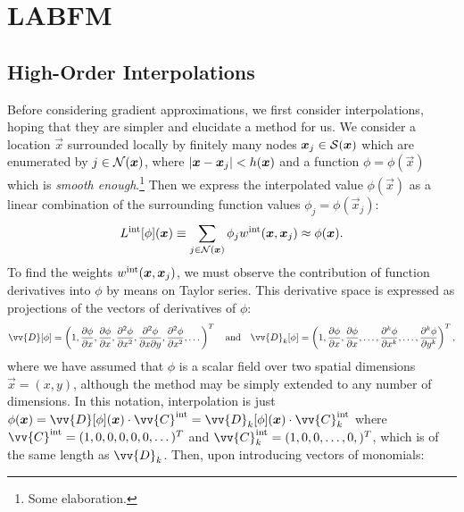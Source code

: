 

\section{LABFM}

\cite{king2024MeshFreeFrameworkHighOrder, king2020HighOrderDifference, king2024MeshfreeFrameworkHighorder, king2022HighorderSimulationsIsothermal, king2024SunsetFlamesDNSCode}


\subsection{High-Order Interpolations}


Before considering gradient approximations, we first consider interpolations, hoping that they are simpler and elucidate a method for us. We consider a location $\vec{x}$ surrounded locally by finitely many nodes $\vec{x}_j \in \cl{S}(\vec{x})$ which are enumerated by $j \in \cl{N}(\vec{x})$, where $\abs{\vec{x} - \vec{x}_j} < h(\vec{x})$ and a function $\phi = \phi(\vec{x})$ which is \emph{smooth enough}.\footnote{Some elaboration.} Then we express the interpolated value $\phi(\vec{x})$ as a linear combination of the surrounding function values $\phi_j = \phi(\vec{x}_j)$:
\begin{equation} \label{eqn:L}
L^{\rm{int}}[\phi](\vec{x}) \equiv \sum_{j \in \cl{N}(\vec{x})} \phi_j w^{\rm{int}}(\vec{x}, \vec{x}_j) \approx \phi(\vec{x}).
\end{equation}
To find the weights $w^{\rm{int}}(\vec{x}, \vec{x}_j)$, we must observe the contribution of function derivatives into $\phi$ by means on Taylor series. This derivative space is expressed as projections of the vectors of derivatives of $\phi$:
\begin{equation}
\vv{D}[\phi] = \left(1, \pdv{\phi}{x}, \pdv{\phi}{x}, \pdv[2]{\phi}{x}, \pdv[2]{\phi}{x}{y}, \pdv[2]{\phi}{x}, \dots \right)^T
\quad \text{and} \quad
\vv{D}_k[\phi] = \left(1, \pdv{\phi}{x}, \pdv{\phi}{x}, \dots, \pdv[k]{\phi}{x}, \dots, \pdv[k]{\phi}{y} \right)^T,
\end{equation}
where we have assumed that $\phi$ is a scalar field over two spatial dimensions $\vec{x}=(x, y)$, although the method may be simply extended to any number of dimensions. In this notation, interpolation is just $\phi(\vec{x}) = \vv{D}[\phi](\vec{x}) \cdot \vv{C}^{\rm{int}} = \vv{D}_k[\phi](\vec{x}) \cdot \vv{C}_k^{\rm{int}}$ where $\vv{C}^{\rm{int}} = (1, 0, 0, 0, 0, 0, \dots)^T$ and $\vv{C}_k^{\rm{int}} = (1, 0, 0, \dots, 0,)^T$, which is of the same length as $\vv{D}_k$. Then, upon introducing vectors of monomials:
